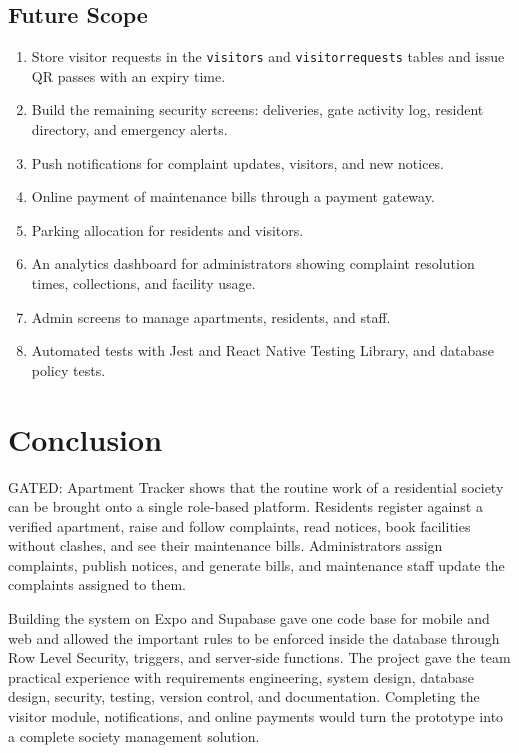 \documentclass{tietreport}
\renewcommand{\_}{\textunderscore\allowbreak}
\begin{document}
\subsection{Future Scope}

\begin{enumerate}
  \item Store visitor requests in the \texttt{visitors} and
  \texttt{visitor\_requests} tables and issue QR passes with an expiry time.
  \item Build the remaining security screens: deliveries, gate activity
  log, resident directory, and emergency alerts.
  \item Push notifications for complaint updates, visitors, and new
  notices.
  \item Online payment of maintenance bills through a payment gateway.
  \item Parking allocation for residents and visitors.
  \item An analytics dashboard for administrators showing complaint
  resolution times, collections, and facility usage.
  \item Admin screens to manage apartments, residents, and staff.
  \item Automated tests with Jest and React Native Testing Library, and
  database policy tests.
\end{enumerate}


\section{Conclusion}

GATED: Apartment Tracker shows that the routine work of a residential society
can be brought onto a single role-based platform. Residents register against
a verified apartment, raise and follow complaints, read notices, book
facilities without clashes, and see their maintenance bills. Administrators
assign complaints, publish notices, and generate bills, and maintenance staff
update the complaints assigned to them.

Building the system on Expo and Supabase gave one code base for mobile and
web and allowed the important rules to be enforced inside the database
through Row Level Security, triggers, and server-side functions. The project
gave the team practical experience with requirements engineering, system
design, database design, security, testing, version control, and
documentation. Completing the visitor module, notifications, and online
payments would turn the prototype into a complete society management
solution.
\end{document}
